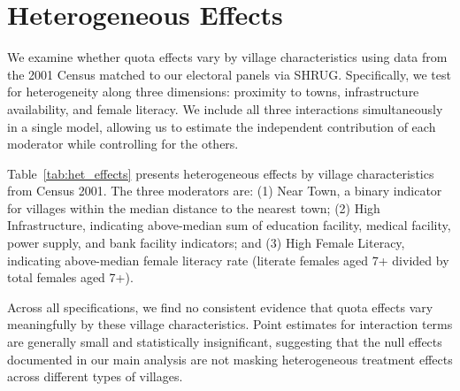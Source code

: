 \documentclass[12pt]{article}
\begin{document}
\begin{table}[!htbp]
    \centering
    \caption{Long-Term Effects: Random Rotation Districts (2005--2015)}
    \label{tab:long_term_random_rotation}
    
\end{table}
\FloatBarrier


\clearpage
\section{Heterogeneous Effects}\label{sec:app_het}

We examine whether quota effects vary by village characteristics using data from the 2001 Census matched to our electoral panels via SHRUG. Specifically, we test for heterogeneity along three dimensions: proximity to towns, infrastructure availability, and female literacy. We include all three interactions simultaneously in a single model, allowing us to estimate the independent contribution of each moderator while controlling for the others.

Table~\ref{tab:het_effects} presents heterogeneous effects by village characteristics from Census 2001. The three moderators are: (1) Near Town, a binary indicator for villages within the median distance to the nearest town; (2) High Infrastructure, indicating above-median sum of education facility, medical facility, power supply, and bank facility indicators; and (3) High Female Literacy, indicating above-median female literacy rate (literate females aged 7+ divided by total females aged 7+).

Across all specifications, we find no consistent evidence that quota effects vary meaningfully by these village characteristics. Point estimates for interaction terms are generally small and statistically insignificant, suggesting that the null effects documented in our main analysis are not masking heterogeneous treatment effects across different types of villages.

\begin{table}[!htbp]
    \centering
    \caption{Heterogeneous Effects by Village Characteristics}
    \label{tab:het_effects}
    
\end{table}
\FloatBarrier
\end{document}
